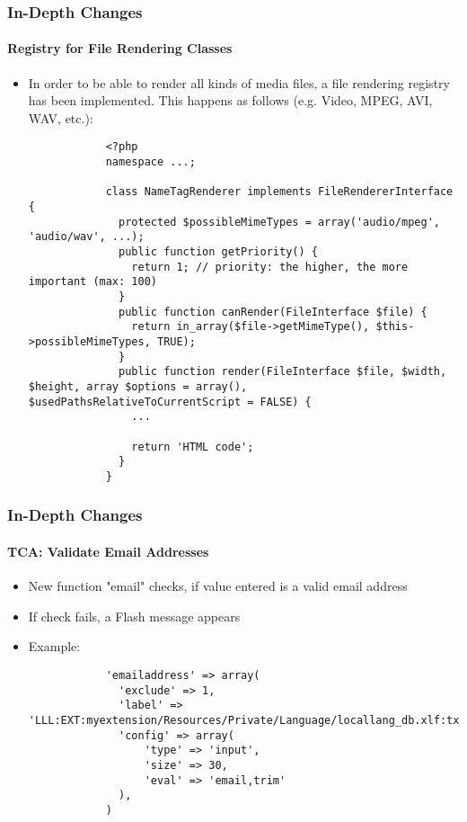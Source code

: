 \begin{frame}[fragile]
	\frametitle{In-Depth Changes}
	\framesubtitle{Registry for File Rendering Classes}

	\lstset{
		basicstyle=\tiny\ttfamily
	}

	\begin{itemize}
		\item In order to be able to render all kinds of media files,
			a file rendering registry has been implemented.\newline
			This happens as follows (e.g. Video, MPEG, AVI, WAV, etc.):

		\begin{lstlisting}
			<?php
			namespace ...;

			class NameTagRenderer implements FileRendererInterface {
			  protected $possibleMimeTypes = array('audio/mpeg', 'audio/wav', ...);
			  public function getPriority() {
			    return 1; // priority: the higher, the more important (max: 100)
			  }
			  public function canRender(FileInterface $file) {
			    return in_array($file->getMimeType(), $this->possibleMimeTypes, TRUE);
			  }
			  public function render(FileInterface $file, $width, $height, array $options = array(), $usedPathsRelativeToCurrentScript = FALSE) {
			    ...

			    return 'HTML code';
			  }
			}
		\end{lstlisting}

	\end{itemize}

\end{frame}


\begin{frame}[fragile]
	\frametitle{In-Depth Changes}
	\framesubtitle{TCA: Validate Email Addresses}

	\lstset{
		basicstyle=\tiny\ttfamily
	}

	\begin{itemize}

		\item New function "email" checks, if value entered is a valid email address
		\item If check fails, a Flash message appears
		\item Example:

		\begin{lstlisting}
			'emailaddress' => array(
			  'exclude' => 1,
			  'label' => 'LLL:EXT:myextension/Resources/Private/Language/locallang_db.xlf:tx_myextension
		 	  'config' => array(
			      'type' => 'input',
			      'size' => 30,
			      'eval' => 'email,trim'
			  ),
			)
		\end{lstlisting}

	\end{itemize}

\end{frame}

